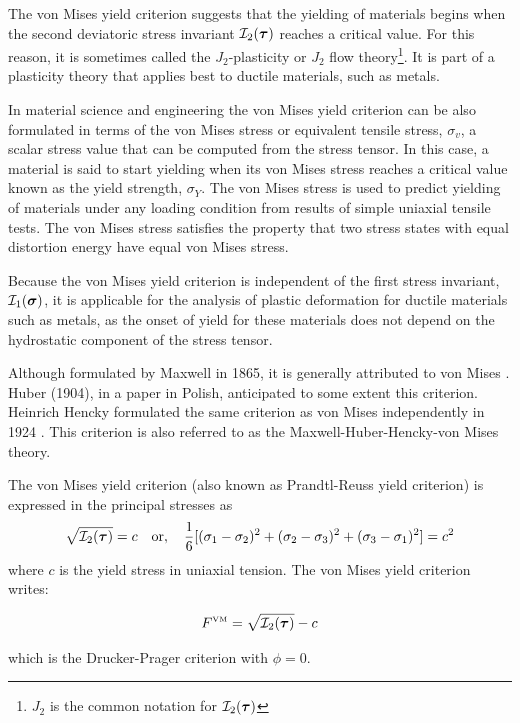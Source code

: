The von Mises yield criterion suggests that the yielding of materials begins when the second 
deviatoric stress invariant ${\cal I}_2({\bm \tau})$ reaches a critical value. 
For this reason, it is sometimes called the $J_2$-plasticity or $J_2$ flow 
theory\footnote{$J_2$ is the common notation for ${\cal I}_2({\bm \tau})$}. 
It is part of a plasticity theory that applies best to ductile materials, such as metals. 

In material science and engineering the von Mises yield criterion can be also formulated in terms of 
the von Mises stress or equivalent tensile stress, $\sigma_v$, a scalar stress value that can be computed 
from the stress tensor. In this case, a material is said to start yielding when its von Mises stress 
reaches a critical value known as the yield strength, $\sigma_Y$. The von Mises stress is used to predict 
yielding of materials under any loading condition from results of simple uniaxial tensile tests. The 
von Mises stress satisfies the property that two stress states with equal distortion energy have equal 
von Mises stress. 

Because the von Mises yield criterion is independent of the first stress invariant, ${\cal I}_1({\bm \sigma})$, 
it is applicable 
for the analysis of plastic deformation for ductile materials such as metals, as the onset of yield for these materials does not depend on the hydrostatic component of the stress tensor. 

Although formulated by Maxwell in 1865, it is generally attributed to von Mises \cite{vonm13}. 
Huber (1904), in a paper in Polish, anticipated to some extent this criterion. 
Heinrich Hencky formulated the same criterion as von Mises independently in 1924 \cite{henc24,tata03}.
This criterion is also referred to as the Maxwell-Huber-Hencky-von Mises theory. 

The von Mises yield criterion (also known as Prandtl-Reuss yield criterion) 
is expressed in the principal stresses as
\[
\sqrt{{\cal I}_2({\bm \tau})} = c \quad \text{or}, \quad 
\frac{1}{6}[(\sigma_1 - \sigma_2)^2 + (\sigma_2 - \sigma_3)^2 + (\sigma_3 - \sigma_1)^2] =  c^2 
\]
where $c$ is the yield stress in uniaxial tension.
The von Mises yield criterion writes:

\begin{mdframed}[backgroundcolor=blue!5]
\begin{equation}
F^{\text{\tiny VM}}= \sqrt{{\cal I}_2({\bm \tau})  } - c  \label{vmcrit}
\end{equation}
\end{mdframed}
which is the Drucker-Prager criterion with $\phi=0$.

